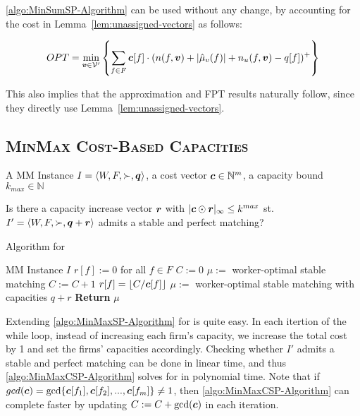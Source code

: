 \autoref{algo:MinSumSP-Algorithm} can be used without any change, by accounting for the cost in Lemma~\ref{lem:unassigned-vectors} as follows:

$$OPT = \min\limits_{{\boldsymbol{v}} \in \mathcal{V}'} \left\{ \sum\limits_{f \in F} \boldsymbol{c}[f] \cdot (n(f, {\boldsymbol{v}}) + |\hat{\mu}_v(f)| + n_u(f, {\boldsymbol{v}}) - q[f])^+ \right\}$$

This also implies that the approximation and FPT results naturally follow, since they directly use Lemma~\ref{lem:unassigned-vectors}.

\subsection{\textsc{MinMax Cost-Based Capacities}}

\begin{pinput}
  A MM Instance $I = \left< W, F, \succ, \boldsymbol{q} \right>$, a cost vector $\boldsymbol{c} \in \mathbb{N}^m$, a capacity bound $k_{max} \in \mathbb{N}$
\end{pinput}
\begin{question}[\MinMaxCSP]
  Is there a capacity increase vector $\boldsymbol{r}$ with $|\boldsymbol{c} \odot \boldsymbol{r}|_\infty \leq k^{max}$ st. $I' = \left< W, F, \succ, \boldsymbol{q} + \boldsymbol{r} \right>$ admits a stable and perfect matching?
\end{question}

\begin{algorithm}
  \caption{Algorithm for \MinMaxCSP}
  \label{algo:MinMaxCSP-Algorithm}
  \begin{algorithmic}
    \REQUIRE MM Instance $I$
    \STATE $r[f] := 0$ for all $f \in F$
    \STATE $C := 0$
    \STATE $\mu :=$ worker-optimal stable matching
    \STATE $C := C + 1$
    \STATE $r[f] = \lfloor C / \boldsymbol{c}[f] \rfloor$
    \STATE $\mu :=$ worker-optimal stable matching with capacities $q + r$
    \ENDWHILE
    \STATE \textbf{Return} $\mu$
  \end{algorithmic}
\end{algorithm}



Extending \autoref{algo:MinMaxSP-Algorithm} for \MinMaxCSP is quite easy. In each itertion of the while loop, instead of increasing each firm's capacity, we increase the total cost by 1 and set the firms' capacities accordingly. Checking whether $I'$ admits a stable and perfect matching can be done in linear time, and thus \autoref{algo:MinMaxCSP-Algorithm} solves for \MinMaxCSP in polynomial time. Note that if $gcd(\boldsymbol{c}) = \gcd \{ \boldsymbol{c}[f_1], \boldsymbol{c}[f_2], ..., \boldsymbol{c}[f_m] \} \neq 1$, then \autoref{algo:MinMaxCSP-Algorithm} can complete faster by updating $C := C + \gcd(\boldsymbol{c})$ in each iteration.

